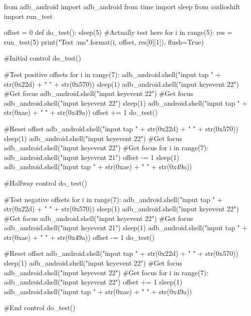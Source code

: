 \begin{mdframed}
    \begin{python}
from adb_android import adb_android
from time import sleep
from audioshift import run_test

offset = 0
def do_test():
    sleep(5)
    #Actually test here
    for i in range(5):
        res = run_test(5)
        print("Test {} {}:{}ms".format(i, offset, res[0][1]), flush=True)

#Initial control
do_test()

#Test positive offsets
for i in range(7):
    adb_android.shell("input tap " + str(0x22d) + " " + str(0x570))
    sleep(1)
    adb_android.shell("input keyevent 22") #Get focus
    adb_android.shell("input keyevent 22") #Get focus
    adb_android.shell("input keyevent 22")
    sleep(1)
    adb_android.shell("input tap " + str(0xae) + " " + str(0x49a))
    offset += 1
    do_test()

#Reset offset
adb_android.shell("input tap " + str(0x22d) + " " + str(0x570))
sleep(1)
adb_android.shell("input keyevent 22") #Get focus
adb_android.shell("input keyevent 22") #Get focus
for i in range(7):
    adb_android.shell("input keyevent 21")
    offset -= 1
sleep(1)
adb_android.shell("input tap " + str(0xae) + " " + str(0x49a))

#Halfway control
do_test()

#Test negative offsets
for i in range(7):
    adb_android.shell("input tap " + str(0x22d) + " " + str(0x570))
    sleep(1)
    adb_android.shell("input keyevent 22") #Get focus
    adb_android.shell("input keyevent 22") #Get focus
    adb_android.shell("input keyevent 21")
    sleep(1)
    adb_android.shell("input tap " + str(0xae) + " " + str(0x49a))
    offset -= 1
    do_test()

#Reset offset
adb_android.shell("input tap " + str(0x22d) + " " + str(0x570))
sleep(1)
adb_android.shell("input keyevent 22") #Get focus
adb_android.shell("input keyevent 22") #Get focus
for i in range(7):
    adb_android.shell("input keyevent 22")
    offset += 1
sleep(1)
adb_android.shell("input tap " + str(0xae) + " " + str(0x49a))

#End control
do_test()
    \end{python}
\end{mdframed}
\clearpage

